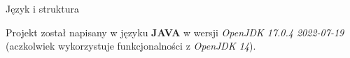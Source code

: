 \begin{frame}{Język i struktura}

    Projekt został napisany w języku \textbf{JAVA} w wersji \textit{OpenJDK 17.0.4 2022-07-19} (aczkolwiek wykorzystuje funkcjonalności z \textit{OpenJDK 14}).
    




\end{frame}
